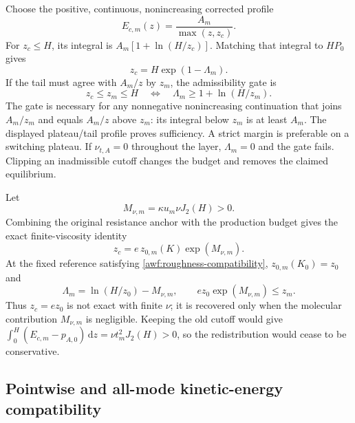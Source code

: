 \documentclass[11pt,a4paper]{article}
\numberwithin{equation}{section}
\newcommand{\dd}{\mathrm d}
\begin{document}
Choose the positive, continuous, nonincreasing corrected profile
\begin{equation}
 E_{c,m}(z)=\frac{A_m}{\max(z,z_c)}.
 \label{awf:corrected-epsilon}
\end{equation}
For $z_c\leq H$, its integral is $A_m[1+\ln(H/z_c)]$.
Matching that integral to $HP_0$ gives
\begin{equation}
 \boxed{z_c=H\exp(1-\Lambda_m).}
 \label{awf:cutoff}
\end{equation}
If the tail must agree with $A_m/z$ by $z_m$, the admissibility gate is
\begin{equation}
 \boxed{z_c\leq z_m\leq H
 \quad\Longleftrightarrow\quad
 \Lambda_m\geq1+\ln(H/z_m).}
 \label{awf:gate}
\end{equation}
The gate is necessary for any nonnegative nonincreasing continuation
that joins $A_m/z_m$ and equals $A_m/z$ above $z_m$: its integral
below $z_m$ is at least $A_m$. The displayed plateau/tail profile
proves sufficiency. A strict margin is preferable on a switching
plateau. If $\nu_{t,A}=0$ throughout the layer, $\Lambda_m=0$ and
the gate fails. Clipping an inadmissible cutoff changes the budget
and removes the claimed equilibrium.

Let
\begin{equation}
 M_{\nu,m}=\kappa u_m\nu J_2(H)>0.
 \label{awf:molecular-budget}
\end{equation}
Combining the original resistance anchor with the production budget
gives the exact finite-viscosity identity
\begin{equation}
 \boxed{z_c=e\,z_{0,m}(K)\exp(M_{\nu,m}).}
 \label{awf:cutoff-roughness}
\end{equation}
At the fixed reference satisfying
\cref{awf:roughness-compatibility}, $z_{0,m}(K_0)=z_0$ and
\begin{equation}
 \Lambda_m=\ln(H/z_0)-M_{\nu,m},\qquad
 \boxed{e z_0\exp(M_{\nu,m})\leq z_m.}
 \label{awf:finite-nu-gate}
\end{equation}
Thus $z_c=e z_0$ is not exact with finite $\nu$; it is recovered
only when the molecular contribution $M_{\nu,m}$ is negligible.
Keeping the old cutoff would give
$\int_0^H(E_{c,m}-p_{A,0})\,\dd z=\nu t_m^2J_2(H)>0$,
so the redistribution would cease to be conservative.


\subsection{Pointwise and all-mode kinetic-energy compatibility}
\label{awf:moments}
\end{document}
